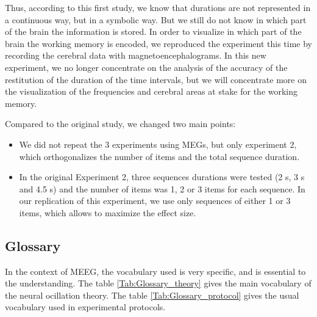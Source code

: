 Thus, according to this first study, we know that durations are not represented in a continuous way, but in a symbolic way. But we still do not know in which part of the brain the information is stored. In order to visualize in which part of the brain the working memory is encoded, we reproduced the experiment this time by recording the cerebral data with magnetoencephalograms. In this new experiment, we no longer concentrate on the analysis of the accuracy of the restitution of the duration of the time intervals, but we will concentrate more on the visualization of the frequencies and cerebral areas at stake for the working memory.

Compared to the original study, we changed two main points:

\begin{itemize}
    \item We did not repeat the 3 experiments using MEGs, but only experiment 2, which orthogonalizes the number of items and the total sequence duration.
    \item In the original Experiment 2, three sequences durations were tested (2 s, 3 s and 4.5 s) and the number of items was 1, 2 or 3 items for each sequence. In our replication of this experiment, we use only sequences of either 1 or 3 items, which allows to maximize the effect size.
\end{itemize}



\subsection{Glossary}

In the context of MEEG, the vocabulary used is very specific, and is essential to the understanding. The table \ref{Tab:Glossary_theory} gives the main vocabulary of the neural ocillation theory. The table \ref{Tab:Glossary_protocol} gives the usual vocabulary used in experimental protocols.

